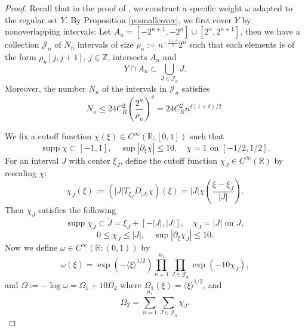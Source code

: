 \documentclass[reqno,12pt,letterpaper]{amsart}
\numberwithin{equation}{section}
\numberwithin{prop}{section}
\DeclareMathOperator{\supp}{supp}
\begin{document}

\begin{proof}
Recall that in the proof of \cite[Lemma 3.1]{fullgap}, we construct a specific weight $\omega$ adapted to the regular set $Y$. By Proposition \ref{p:smallcover}, we first cover $Y$ by nonoverlapping intervals: Let $A_n=[-2^{n+1},-2^n]\cup[2^n,2^{n+1}]$, then we have a collection $\mathcal{J}_n$ of $N_n$ intervals of size $\rho_n:=n^{-\frac{1+\delta}{2}}2^n$ such that each elements is of the form $\rho_n[j,j+1]$, $j\in\mathbb{Z}$, intersects $A_n$ and
\begin{equation*}
Y\cap A_n\subset\bigcup_{J\in\mathcal{J}_n}J.
\end{equation*}
Moreover, the number $N_n$ of the intervals in $\mathcal{J}_n$ satisfies
\begin{equation*}
N_n\leq 24C_R^2\left(\frac{2^n}{\rho_n}\right)^\delta=24C_R^2n^{\delta(1+\delta)/2}.
\end{equation*}

We fix a cutoff function $\chi(\xi)\in C^\infty(\mathbb{R};[0,1])$ such that
\begin{equation*}
\supp\chi\subset[-1,1], 
\quad
\sup|\partial_\xi\chi|\leq 10,
\quad
\chi=1 \text{ on } [-1/2,1/2].
\end{equation*}
For an interval $J$ with center $\xi_J$, define the cutoff function $\chi_J\in C^\infty(\mathbb{R})$ by rescaling $\chi$:
\begin{equation*}
\chi_J(\xi):=(|J|T_{\xi_J}D_{|J|}\chi)(\xi)=|J|\chi\left(\frac{\xi-\xi_J}{|J|}\right).
\end{equation*}
Then $\chi_J$ satisfies the following 
\begin{equation*}
\supp\chi_J\subset\widetilde{J}=\xi_J+[-|J|,|J|],
\quad
\chi_J=|J| \text{ on } J,
\end{equation*}
\begin{equation*}
0\leq\chi_J\leq|J|,
\quad \sup|\partial_\xi\chi_J|\leq10.
\end{equation*}
Now we define $\omega\in C^\infty(\mathbb{R};(0,1))$ by
\begin{equation*}
\omega(\xi)=\exp(-\langle\xi\rangle^{1/2})\prod_{n=1}^{n_1}\prod_{J\in\mathcal{J}_n}\exp(-10\chi_J),
\end{equation*}
and $\Omega:=-\log\omega=\Omega_1+10\Omega_2$ where $\Omega_1(\xi)=\langle\xi\rangle^{1/2}$, and
\begin{equation*}
\Omega_2=\sum_{n=1}^{n_1}\sum_{J\in\mathcal{J}_n}\chi_J.
\end{equation*}


\end{proof}
\end{document}
